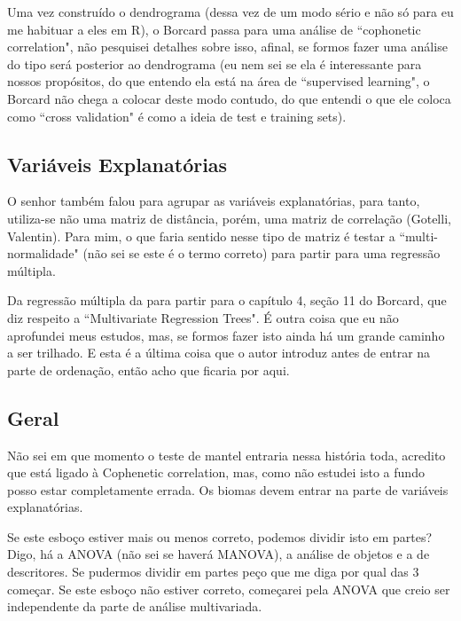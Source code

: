 \documentclass[12pt]{extarticle}
\newcommand{\asp}[1]{``#1"}
\begin{document}
Uma vez construído o dendrograma (dessa vez de um modo sério e não só para eu me habituar a eles em R), o Borcard passa para uma análise de \asp{cophonetic correlation}, não pesquisei detalhes sobre isso, afinal, se formos fazer uma análise do tipo será posterior ao dendrograma (eu nem sei se ela é interessante para nossos propósitos, do que entendo ela está na área de \asp{supervised learning}, o Borcard não chega a colocar deste modo contudo, do que entendi o que ele coloca como \asp{cross validation} é como a ideia de test e training sets). 

\subsection{Variáveis Explanatórias}

O senhor também falou para agrupar as variáveis explanatórias, para tanto, utiliza-se não uma matriz de distância, porém, uma matriz de correlação (Gotelli, Valentin). Para mim, o que faria sentido nesse tipo de matriz é testar a \asp{multi-normalidade} (não sei se este é o termo correto) para partir para uma regressão múltipla. 

Da regressão múltipla da para partir para o capítulo 4, seção 11 do Borcard, que diz respeito a \asp{Multivariate Regression Trees}. É outra coisa que eu não aprofundei meus estudos, mas, se formos fazer isto ainda há um grande caminho a ser trilhado. E esta é a última coisa que o autor introduz antes de entrar na parte de ordenação, então acho que ficaria por aqui.

\subsection{Geral}

Não sei em que momento o teste de mantel entraria nessa história toda, acredito que está ligado à Cophenetic correlation, mas, como não estudei isto a fundo posso estar completamente errada. Os biomas devem entrar na parte de variáveis explanatórias.

Se este esboço estiver mais ou menos correto, podemos dividir isto em partes? Digo, há a ANOVA (não sei se haverá MANOVA), a análise de objetos e a de descritores. Se pudermos dividir em partes peço que me diga por qual das 3 começar. Se este esboço não estiver correto, começarei pela ANOVA que creio ser independente da parte de análise multivariada.



\end{document}

